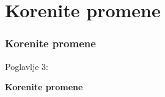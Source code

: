 %

\section{Korenite promene}
\begin{frame}[fragile]
	\frametitle{Korenite promene}

	\begin{center}\huge{Poglavlje 3:}\end{center}
	\begin{center}\huge{\color{typo3darkgrey}\textbf{Korenite promene}}\end{center}

\end{frame}


